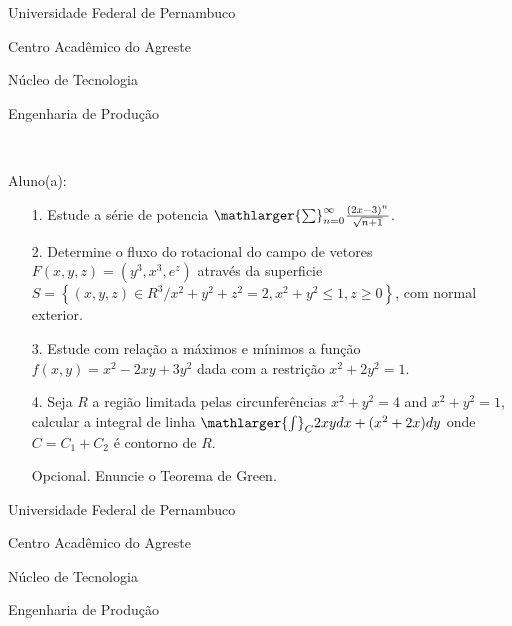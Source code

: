 \documentclass[oneside,a4paper,12pt]{article}
\newcommand{\universidade}{Universidade Federal de Pernambuco}
\newcommand{\centro}{Centro Acadêmico do Agreste}
\newcommand{\departamento}{Núcleo de Tecnologia}
\newcommand{\curso}{Engenharia de Produção}
\begin{document}
	\pagestyle{empty}
	
	\begin{center}
	 	\vspace{0pt}
	 	
		\universidade
		\par
		\centro
		\par
		\departamento
		\par
		\curso
		\par
		\vspace{08pt}
		\\
	\end{center}
	
	
	\begin{flushleft}
		Aluno(a):
	\end{flushleft}
	
\begin{itemize}
\item[1.] Estude a série de potencia  $\mathlarger{\sum}_{n=0}^{\infty}\frac{(2x-3)^{n}}{\sqrt{n+1}}$.
\end{itemize}
\begin{itemize}
\item[2.] Determine o fluxo do rotacional do campo de vetores $F(x,y,z)=(y^{3},x^{3},e^{z})$ através da superficie $S=\left\lbrace (x,y,z)\in R^{3} / x^{2}+y^{2}+z^{2}=2, x^{2}+y^{2}\leq 1, z\geq 0 \right\rbrace $, com normal exterior. 
 \end{itemize}
 \begin{itemize}
\item [3.] Estude com relação a máximos e mínimos a função $f(x,y)=x^{2}-2xy+3y^{2}$ dada com a restrição $x^{2}+2y^{2}=1$.
\end{itemize}
\begin{itemize}
\item[4.] Seja $R$ a região limitada pelas circunferências $x^{2}+y^{2}=4$ and $x^{2}+y^{2}=1$, calcular a integral de linha $\mathlarger{\int}_{C}2xydx+(x^{2}+2x)dy$ onde $C=C_{1}+C_{2}$ é contorno de $R$.
\end{itemize}
 \begin{itemize}
	\item[Opcional.] Enuncie o Teorema de Green.
\end{itemize}
     \begin{center}
     	\vspace{20pt}
     	
     	\universidade
     	\par
     	\centro
     	\par
     	\departamento
     	\par
     	\curso
     	\par
     	\vspace{12pt}
     	\\
     \end{center}
     
\end{document}
